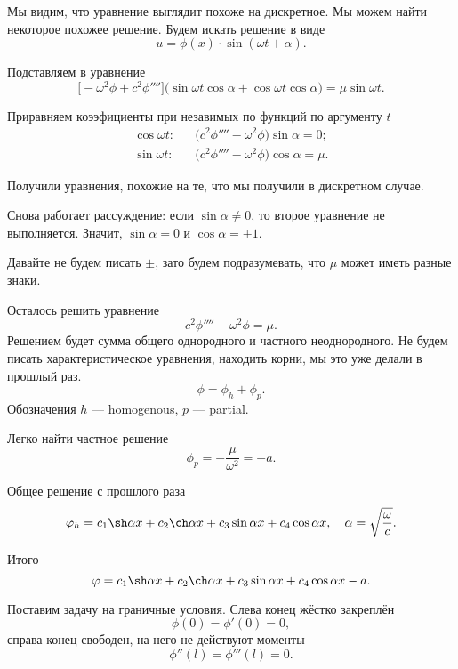 Мы видим, что уравнение выглядит похоже на дискретное. Мы можем найти некоторое похожее решение. Будем искать решение в виде
\[
  u = \phi(x) \cdot \sin (\omega t + \alpha).
\]

Подставляем в уравнение
\[
  \big[- \omega^2 \phi + c^2 \phi''''\big]\big(\sin\omega t \cos\alpha + \cos\omega t\cos\alpha\big) = \mu \sin\omega t.
\]

Приравняем коээфициенты при незавимых по функций по аргументу $t$
\begin{eqnarray*}
  \cos\omega t\colon&&\big(c^2 \phi'''' - \omega^2\phi\big)\sin\alpha = 0;\\
  \sin\omega t\colon&&\big(c^2 \phi'''' - \omega^2\phi\big)\cos\alpha = \mu.
\end{eqnarray*}

Получили уравнения, похожие на те, что мы получили в дискретном случае.

Снова работает рассуждение: если $\sin \alpha \ne 0$, то второе уравнение не выполняется. Значит, $\sin \alpha = 0$ и $\cos\alpha = \pm 1$.

Давайте не будем писать $\pm$, зато будем подразумевать, что $\mu$ может иметь разные знаки.

Осталось решить уравнение
\[
  c^2 \phi'''' - \omega^2 \phi = \mu.
\]
Решением будет сумма общего однородного и частного неоднородного. Не будем писать характеристическое уравнения, находить корни, мы это уже делали в прошлый раз.
\[
  \phi = \phi_h + \phi_p.
\]
Обозначения $h$ --- homogenous, $p$ --- partial.

Легко найти частное решение
\[
  \phi_p = -\frac\mu{\omega^2} = -a.
\]

Общее решение с прошлого раза
\[
  \phi_h = c_1 \sh \alpha x + c_2 \ch \alpha x + c_3 \sin \alpha x + c_4 \cos \alpha x,
  \quad \alpha = \sqrt{\frac{\omega}{c}}.
\]

Итого
\[
  \phi = c_1 \sh \alpha x + c_2 \ch \alpha x + c_3 \sin \alpha x + c_4 \cos \alpha x - a.
\]

Поставим задачу на граничные условия. Слева конец жёстко закреплён
\[
  \phi(0) = \phi'(0) = 0,
\]
справа конец свободен, на него не действуют моменты
\[
  \phi''(l) = \phi'''(l) = 0.
\]


